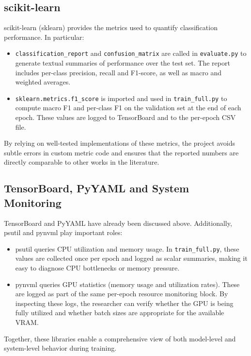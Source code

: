 \subsection{scikit-learn}

scikit-learn (sklearn) provides the metrics used to quantify classification performance. In particular:
\begin{itemize}
  \item \texttt{classification\_report} and \texttt{confusion\_matrix} are called in \texttt{evaluate.py} to generate textual summaries of performance over the test set. The report includes per-class precision, recall and F1-score, as well as macro and weighted averages.
  \item \texttt{sklearn.metrics.f1\_score} is imported and used in \texttt{train\_full.py} to compute macro F1 and per-class F1 on the validation set at the end of each epoch. These values are logged to TensorBoard and to the per-epoch CSV file.
\end{itemize}

By relying on well-tested implementations of these metrics, the project avoids subtle errors in custom metric code and ensures that the reported numbers are directly comparable to other works in the literature.

\subsection{TensorBoard, PyYAML and System Monitoring}

TensorBoard and PyYAML have already been discussed above. Additionally, psutil and pynvml play important roles:
\begin{itemize}
  \item psutil queries CPU utilization and memory usage. In \texttt{train\_full.py}, these values are collected once per epoch and logged as scalar summaries, making it easy to diagnose CPU bottlenecks or memory pressure.
  \item pynvml queries GPU statistics (memory usage and utilization rates). These are logged as part of the same per-epoch resource monitoring block. By inspecting these logs, the researcher can verify whether the GPU is being fully utilized and whether batch sizes are appropriate for the available VRAM.
\end{itemize}

Together, these libraries enable a comprehensive view of both model-level and system-level behavior during training.

